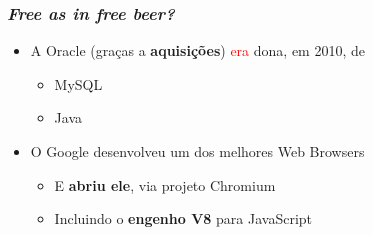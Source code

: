 \documentclass[xcolor=dvipsnames]{beamer}
\newcommand{\tred}[1]{\textcolor{red}{#1}}
\begin{document}
\begin{frame}
	\frametitle{\textit{Free as in free beer?}}
    \begin{itemize}
      \item A Oracle (graças a \textbf{aquisições}) \tred{era} dona, em 2010, de
        \begin{itemize}
        \item MySQL
        \item Java
        \end{itemize}\pause
      \vspace{0.5cm}
      \item O Google desenvolveu um dos melhores Web Browsers
        \begin{itemize}
        \item E \textbf{abriu ele}, via projeto Chromium
        \item Incluindo o \textbf{engenho V8} para JavaScript
        
        \end{itemize}           
    \end{itemize}
\end{frame}
\end{document}
